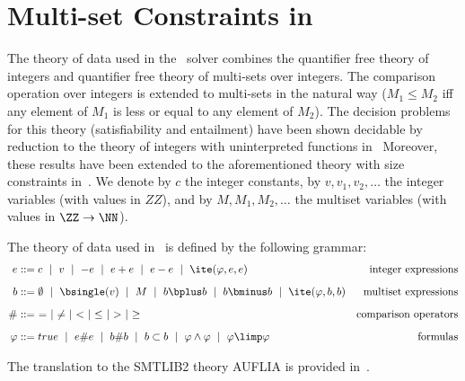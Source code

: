 
\section{Multi-set Constraints in \spen}
\label{sec:fspen}

The theory of data used in the \spen\ solver combines the quantifier free theory of integers and quantifier free theory of multi-sets over integers.
The comparison operation over integers is extended to multi-sets in the natural way
($M_1\leq M_2$ iff any element of $M_1$ is less or equal to any element of $M_2$).
The decision problems for this theory (satisfiability and entailment) have been shown decidable by reduction to the theory of integers with uninterpreted functions in~\cite{???} 
Moreover, these results have been extended to the aforementioned theory with size constraints in~\cite{DBLP:conf/cade/PiskacK10}.
We denote by $c$ the integer constants, 
by $v,v_1,v_2,\ldots$ the integer variables (with values in $ZZ$), and 
by $M,M_1,M_2,\ldots$ the multiset variables (with values in $\ZZ\rightarrow \NN$). 

The theory of data used in \spen\ is defined by the following grammar:
\begin{align*}
e &::= 
c ~\mid~     %
v ~\mid~     %
-e ~\mid~    %
e + e ~\mid~ %
e - e ~\mid~ %
\ite(\varphi,e,e)
& \mbox{integer expressions} 
\\[2mm]
b &::= 
\emptyset ~\mid~     %
\bsingle(v) ~\mid~   %
M ~\mid~             %
b \bplus b  ~\mid~   %
b \bminus b ~\mid~   %
\ite(\varphi,b,b)
& \mbox{multiset expressions}
\\[2mm]
\# &::=\ = ~\mid~ \neq ~\mid~ < ~\mid~ \leq ~\mid~ > ~\mid~ \geq 
& \mbox{comparison operators} 
\\[2mm]
\varphi &::=
true ~\mid~ 
e \# e ~\mid~ %
b \# b ~\mid~ %
b \subset b ~\mid~ %
\varphi \land \varphi ~\mid~
\varphi \limp \varphi 
& \mbox{formulas}
\end{align*}

The translation to the SMTLIB2 theory AUFLIA is provided in~\cite{DBLP:conf/sigsoft/KapurMZ06}.


